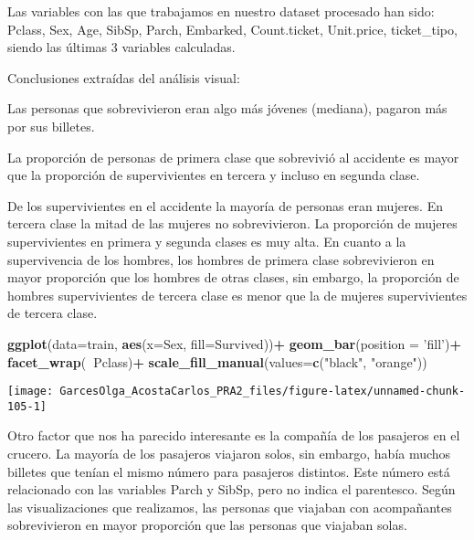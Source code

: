 \documentclass[
]{article}
\newenvironment{Shaded}{\begin{snugshade}}{\end{snugshade}}
\newcommand{\DataTypeTok}[1]{\textcolor[rgb]{0.13,0.29,0.53}{#1}}
\newcommand{\KeywordTok}[1]{\textcolor[rgb]{0.13,0.29,0.53}{\textbf{#1}}}
\newcommand{\NormalTok}[1]{#1}
\newcommand{\OperatorTok}[1]{\textcolor[rgb]{0.81,0.36,0.00}{\textbf{#1}}}
\newcommand{\StringTok}[1]{\textcolor[rgb]{0.31,0.60,0.02}{#1}}
\begin{document}
Las variables con las que trabajamos en nuestro dataset procesado han
sido: Pclass, Sex, Age, SibSp, Parch, Embarked, Count.ticket,
Unit.price, ticket\_tipo, siendo las últimas 3 variables calculadas.

Conclusiones extraídas del análisis visual:

Las personas que sobrevivieron eran algo más jóvenes (mediana), pagaron
más por sus billetes.

La proporción de personas de primera clase que sobrevivió al accidente
es mayor que la proporción de supervivientes en tercera y incluso en
segunda clase.

De los supervivientes en el accidente la mayoría de personas eran
mujeres. En tercera clase la mitad de las mujeres no sobrevivieron. La
proporción de mujeres supervivientes en primera y segunda clases es muy
alta. En cuanto a la supervivencia de los hombres, los hombres de
primera clase sobrevivieron en mayor proporción que los hombres de otras
clases, sin embargo, la proporción de hombres supervivientes de tercera
clase es menor que la de mujeres supervivientes de tercera clase.

\begin{Shaded}
\begin{Highlighting}[]
\KeywordTok{ggplot}\NormalTok{(}\DataTypeTok{data=}\NormalTok{train, }\KeywordTok{aes}\NormalTok{(}\DataTypeTok{x=}\NormalTok{Sex, }\DataTypeTok{fill=}\NormalTok{Survived))}\OperatorTok{+}
\StringTok{  }\KeywordTok{geom_bar}\NormalTok{(}\DataTypeTok{position =} \StringTok{'fill'}\NormalTok{)}\OperatorTok{+}
\StringTok{  }\KeywordTok{facet_wrap}\NormalTok{(}\OperatorTok{~}\NormalTok{Pclass)}\OperatorTok{+}
\StringTok{  }\KeywordTok{scale_fill_manual}\NormalTok{(}\DataTypeTok{values=}\KeywordTok{c}\NormalTok{(}\StringTok{"black"}\NormalTok{, }\StringTok{"orange"}\NormalTok{))}
\end{Highlighting}
\end{Shaded}

\begin{center}\texttt{[image: GarcesOlga\_AcostaCarlos\_PRA2\_files/figure-latex/unnamed-chunk-105-1]} \end{center}

Otro factor que nos ha parecido interesante es la compañía de los
pasajeros en el crucero. La mayoría de los pasajeros viajaron solos, sin
embargo, había muchos billetes que tenían el mismo número para pasajeros
distintos. Este número está relacionado con las variables Parch y SibSp,
pero no indica el parentesco. Según las visualizaciones que realizamos,
las personas que viajaban con acompañantes sobrevivieron en mayor
proporción que las personas que viajaban solas.
\end{document}
